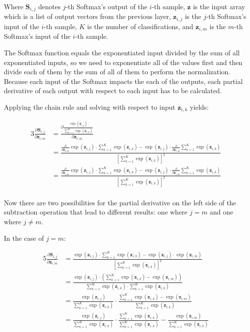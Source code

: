 \documentclass[a4paper]{article}
\newcommand{\matr}[1]{\mathbf{#1}}
\newcommand{\vect}[1]{\bm{#1}}
\begin{document}
Where $\matr{S}_{i,j}$ denotes $j$-th Softmax's output of the $i$-th sample, $\vect{z}$ is the input array which is a list of output vectors from the previous layer, $\vect{z}_{i,j}$ is the $j$-th Softmax's input of the $i$-th sample, $K$ is the number of classifications, and $\vect{z}_{i,m}$ is the $m$-th Softmax's input of the $i$-th sample.

The Softmax function equals the exponentiated input divided by the sum of all exponentiated inputs, so we need to exponentiate all of the values first and then divide each of them by the sum of all of them to perform the normalization. Because each input of the Softmax impacts the each of the outputs, each partial derivative of each output with respect to each input has to be calculated. 

Applying the chain rule and solving with respect to input $\vect{z}_{i,k}$ yields:

\begin{alignat*}{3}
    \frac{\partial \matr{S}_{i,j}}{\partial \vect{z}_{i,m}} &= \frac{\partial \frac{\exp(\vect{z}_{i,j})}{\sum_{k=1}^{K} \exp(\vect{z}_{i,k})}}{\partial \vect{z}_{i,m}} \\
    &= \frac{\frac{\partial}{\partial \vect{z}_{i,m}} \exp(\vect{z}_{i,j}) \cdot \sum_{k=1}^{K} \exp(\vect{z}_{i,k}) - \exp(\vect{z}_{i,j}) \cdot \frac{\partial}{\partial \vect{z}_{i,m}} \sum_{k=1}^{K} \exp(\vect{z}_{i,k})}{[\sum_{k=1}^{K} \exp(\vect{z}_{i,k})]^2} \\
    &= \frac{\frac{\partial}{\partial \vect{z}_{i,m}} \exp(\vect{z}_{i,j}) \cdot \sum_{k=1}^{K} \exp(\vect{z}_{i,k}) - \exp(\vect{z}_{i,j}) \cdot \frac{\partial}{\partial \vect{z}_{i,m}} \sum_{k=1}^{K} \exp(\vect{z}_{i,k})}{[\sum_{k=1}^{K} \exp(\vect{z}_{i,k})]^2} \\
\end{alignat*}

Now there are two possibilities for the partial derivative on the left side of the subtraction operation that lead to different results: one where $j=m$ and one where $j\not=m$.

In the case of $j=m$:

\begin{alignat*}{5}
    \frac{\partial \matr{S}_{i,j}}{\partial \vect{z}_{i,m}} &= 
    \frac{\exp(\vect{z}_{i,j}) \cdot \sum_{k=1}^{K} \exp(\vect{z}_{i,k}) - \exp(\vect{z}_{i,j}) \cdot \exp(\vect{z}_{i,m})}{[\sum_{k=1}^{K} \exp(\vect{z}_{i,k})]^2} \\
    &= \frac{\exp(\vect{z}_{i,j}) \cdot (\sum_{k=1}^{K} \exp(\vect{z}_{i,k}) - \exp(\vect{z}_{i,m}))}{\sum_{k=1}^{K} \exp(\vect{z}_{i,k}) \cdot \sum_{k=1}^{K} \exp(\vect{z}_{i,k})} \\
    &= \frac{\exp(\vect{z}_{i,j})}{\sum_{k=1}^{K} \exp(\vect{z}_{i,k})} \cdot \frac{\sum_{k=1}^{K} \exp(\vect{z}_{i,k}) - \exp(\vect{z}_{i,m})}{\sum_{k=1}^{K} \exp(\vect{z}_{i,k})} \\
    &= \frac{\exp(\vect{z}_{i,j})}{\sum_{k=1}^{K} \exp(\vect{z}_{i,k})} \cdot \frac{\sum_{k=1}^{K} \exp(\vect{z}_{i,k})}{\sum_{k=1}^{K} \exp(\vect{z}_{i,k})} - \frac{\exp(\vect{z}_{i,m})}{\sum_{k=1}^{K} \exp(\vect{z}_{i,k})}
\end{alignat*}
\end{document}
